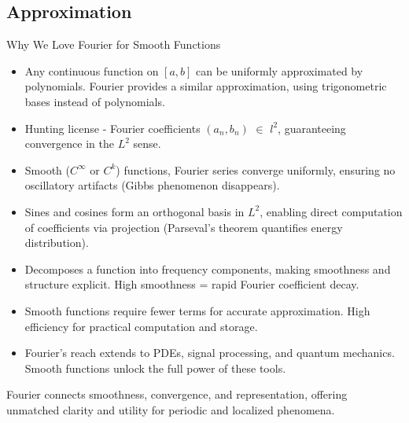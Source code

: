 \subsection{Approximation}
	
\begin{frame}{Why We Love Fourier for Smooth Functions}
    \begin{itemize}
        \item {} 
        Any continuous function on \([a, b]\) can be uniformly approximated by polynomials. Fourier provides a similar approximation, using trigonometric bases instead of polynomials.
        
        \item {} 
        Hunting license - Fourier coefficients \((a_n, b_n)\) $\in$ \(l^2\), guaranteeing convergence in the \(L^2\) sense.

        \item {} 
       Smooth (\(C^\infty\) or \(C^k\)) functions, Fourier series converge uniformly, ensuring no oscillatory artifacts (Gibbs phenomenon disappears).

        \item {} 
        Sines and cosines form an orthogonal basis in \(L^2\), enabling direct computation of coefficients via projection (Parseval's theorem quantifies energy distribution).

        \item {} 
        Decomposes a function into frequency components, making smoothness and structure explicit. High smoothness = rapid Fourier coefficient decay.

        \item {} 
        Smooth functions require fewer terms for accurate approximation. High efficiency for practical computation and storage.

        \item {} 
        Fourier's reach extends to PDEs, signal processing, and quantum mechanics. Smooth functions unlock the full power of these tools.
    \end{itemize}
    \vspace{1em}
     Fourier connects smoothness, convergence, and representation, offering unmatched clarity and utility for periodic and localized phenomena.
\end{frame}

